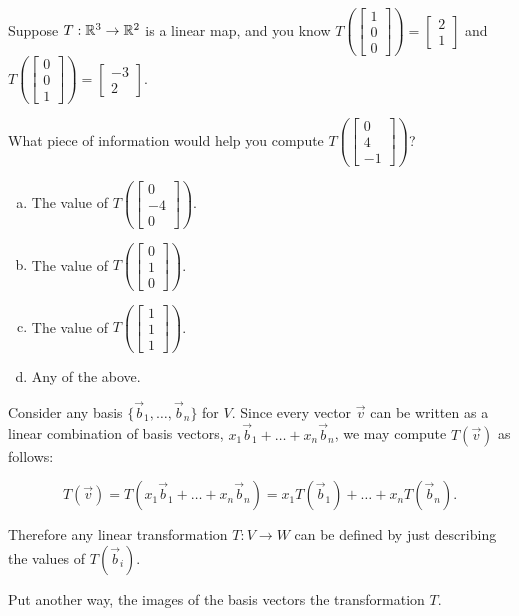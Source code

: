 \begin{activity}{5}
Suppose \(T: \mathbb{R}^3 \rightarrow \mathbb{R}^2\) is a linear map, and you know
\(
  T\left(\begin{bmatrix} 1 \\ 0 \\ 0 \end{bmatrix} \right)
=
  \begin{bmatrix} 2 \\ 1 \end{bmatrix}
\)
and
\(
  T\left(\begin{bmatrix} 0 \\ 0 \\ 1 \end{bmatrix} \right)
=
  \begin{bmatrix} -3 \\ 2 \end{bmatrix}
\).

What piece of information would help you compute \(T\left(\begin{bmatrix}0\\4\\-1\end{bmatrix}\right)\)?
\begin{multicols}{2}
\begin{enumerate}[(a)]
\item The value of \(T\left(\begin{bmatrix} 0\\-4\\0\end{bmatrix}\right)\).
\item The value of \(T\left(\begin{bmatrix} 0\\1\\0\end{bmatrix}\right)\).
\item The value of \(T\left(\begin{bmatrix} 1\\1\\1\end{bmatrix}\right)\).
\item Any of the above.
\end{enumerate}
\end{multicols}
\end{activity}

\begin{fact}
Consider any basis \(\{\vec b_1,\dots,\vec b_n\}\) for $V$.  Since every
vector \(\vec v\) can be written as a linear combination of
basis vectors, \(x_1\vec b_1+\dots+ x_n\vec b_n\), we may compute
\(T(\vec v)\) as follows:

\[
  T(\vec v)=T(x_1\vec b_1+\dots+ x_n\vec b_n)=
  x_1T(\vec b_1)+\dots+x_nT(\vec b_n)
.\]

Therefore any linear transformation \(T:V \rightarrow W\) can be defined
by just describing the values of \(T(\vec b_i)\).

Put another way, the images of the basis vectors  the transformation \(T\).
\end{fact}

